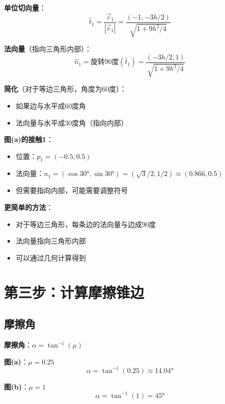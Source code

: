 \documentclass[12pt,a4paper]{article}
\begin{document}
\textbf{单位切向量}：
\begin{equation}
\hat{t}_1 = \frac{\vec{v}_1}{|\vec{v}_1|} = \frac{(-1, -3h/2)}{\sqrt{1 + 9h^2/4}}
\end{equation}

\textbf{法向量}（指向三角形内部）：
\begin{equation}
\hat{n}_1 = \text{旋转90度}(\hat{t}_1) = \frac{(-3h/2, 1)}{\sqrt{1 + 9h^2/4}}
\end{equation}

\textbf{简化}（对于等边三角形，角度为60度）：
\begin{itemize}
\item 如果边与水平成60度角
\item 法向量与水平成30度角（指向内部）
\end{itemize}

\textbf{图(a)的接触1}：
\begin{itemize}
\item 位置：$p_1 = (-0.5, 0.5)$
\item 法向量：$\hat{n}_1 = (\cos 30°, \sin 30°) = (\sqrt{3}/2, 1/2) \approx (0.866, 0.5)$
\item 但需要指向内部，可能需要调整符号
\end{itemize}

\textbf{更简单的方法}：
\begin{itemize}
\item 对于等边三角形，每条边的法向量与边成90度
\item 法向量指向三角形内部
\item 可以通过几何计算得到
\end{itemize}

\section{第三步：计算摩擦锥边}

\subsection{摩擦角}

\textbf{摩擦角}：$\alpha = \tan^{-1}(\mu)$

\textbf{图(a)}：$\mu = 0.25$
\begin{equation}
\alpha = \tan^{-1}(0.25) \approx 14.04°
\end{equation}

\textbf{图(b)}：$\mu = 1$
\begin{equation}
\alpha = \tan^{-1}(1) = 45°
\end{equation}
\end{document}
